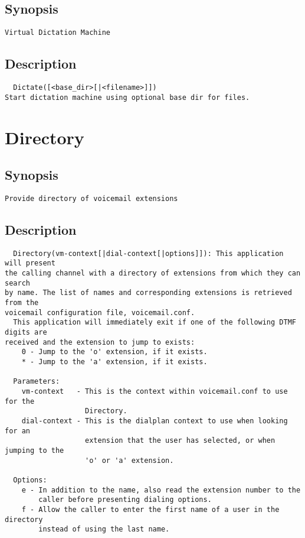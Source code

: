 \subsection{Synopsis}
\begin{verbatim}
Virtual Dictation Machine
\end{verbatim}
\subsection{Description}
\begin{verbatim}
  Dictate([<base_dir>[|<filename>]])
Start dictation machine using optional base dir for files.

\end{verbatim}


\section{Directory}
\subsection{Synopsis}
\begin{verbatim}
Provide directory of voicemail extensions
\end{verbatim}
\subsection{Description}
\begin{verbatim}
  Directory(vm-context[|dial-context[|options]]): This application will present
the calling channel with a directory of extensions from which they can search
by name. The list of names and corresponding extensions is retrieved from the
voicemail configuration file, voicemail.conf.
  This application will immediately exit if one of the following DTMF digits are
received and the extension to jump to exists:
    0 - Jump to the 'o' extension, if it exists.
    * - Jump to the 'a' extension, if it exists.

  Parameters:
    vm-context   - This is the context within voicemail.conf to use for the
                   Directory.
    dial-context - This is the dialplan context to use when looking for an
                   extension that the user has selected, or when jumping to the
                   'o' or 'a' extension.

  Options:
    e - In addition to the name, also read the extension number to the
        caller before presenting dialing options.
    f - Allow the caller to enter the first name of a user in the directory
        instead of using the last name.

\end{verbatim}


